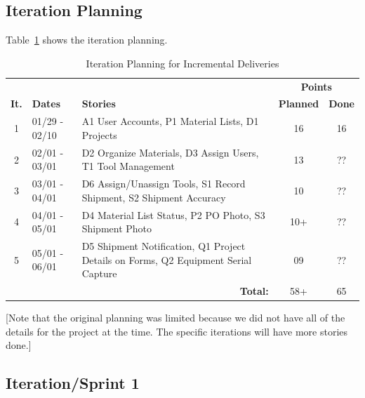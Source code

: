 \documentclass{article}
\begin{document}
\subsection{Iteration Planning}

Table~\ref{tab:it-planning} shows the iteration planning.

\begin{table}[h!]
\centering
\begin{tabular}{c l p{7cm} c c}
\hline
 & & & \multicolumn{2}{c}{\bf Points }  \\
\textbf{It.} & \textbf{Dates} & \textbf{Stories} & \textbf{Planned} & \textbf{Done} \\
\hline
1 & 01/29 - 02/10 & A1 User Accounts, P1 Material Lists, D1 Projects & 16 & 16\\ \hline
2 & 02/01 - 03/01 & D2 Organize Materials, D3 Assign Users, T1 Tool Management & 13 & ?? \\ \hline
3 & 03/01 - 04/01 & D6 Assign/Unassign Tools, S1 Record Shipment, S2 Shipment Accuracy & 10 & ?? \\ \hline
4 & 04/01 - 05/01 & D4 Material List Status, P2 PO Photo, S3 Shipment Photo & 10+ & ??\\ \hline
5 & 05/01 - 06/01 & D5 Shipment Notification, Q1 Project Details on Forms, Q2 Equipment Serial Capture & 09 & ?? \\ \hline
\multicolumn{3}{r}{\bf Total: } & 58+ & 65 \\ \hline
\end{tabular}
\caption{Iteration Planning for Incremental Deliveries}\label{tab:it-planning}
\end{table}

[Note that the original planning was limited because we did not have all of the details for the project at the time. The specific iterations will have more stories done.]

\subsection{Iteration/Sprint 1}
\end{document}
